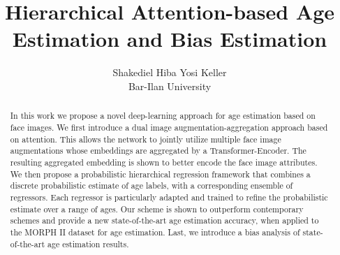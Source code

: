 \documentclass[10pt,twocolumn,letterpaper]{article}
\begin{document}
\title{Hierarchical Attention-based Age Estimation and Bias Estimation}

\author{
 Shakediel Hiba \qquad Yosi Keller \\
 Bar-Ilan University
}






\begin{abstract}
In this work we propose a novel deep-learning approach for age estimation
based on face images. We first introduce a dual image
augmentation-aggregation approach based on attention. This allows the
network to jointly utilize multiple face image augmentations whose
embeddings are aggregated by a Transformer-Encoder. The resulting aggregated
embedding is shown to better encode the face image attributes. We then
propose a probabilistic hierarchical regression framework that combines a
discrete probabilistic estimate of age labels, with a corresponding ensemble
of regressors. Each regressor is particularly adapted and trained to refine
the probabilistic estimate over a range of ages. Our scheme is shown to
outperform contemporary schemes and provide a new state-of-the-art age
estimation accuracy, when applied to the MORPH II dataset for age
estimation. Last, we introduce a bias analysis of state-of-the-art age estimation results.
\end{abstract}
\end{document}
